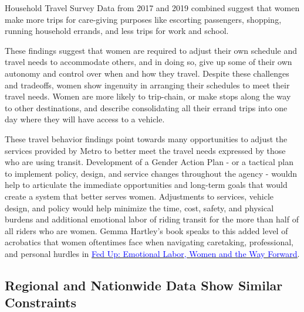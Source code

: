 \documentclass[
  12pt,
]{article}
\begin{document}
\begin{flushleft}
Household Travel Survey Data from 2017 and 2019 combined suggest that women make more trips for care-giving purposes like escorting passengers, shopping, running household errands, and less trips for work and school.

These findings suggest that women are required to adjust their own schedule and travel needs to accommodate others, and in doing so, give up some of their own autonomy and control over when and how they travel. Despite these challenges and tradeoffs, women show ingenuity in arranging their schedules to meet their travel needs. Women are more likely to trip-chain, or make stops along the way to other destinations, and describe consolidating all their errand trips into one day where they will have access to a vehicle.

These travel behavior findings point towards many opportunities to adjust the services provided by Metro to better meet the travel needs expressed by those who are using transit. Development of a Gender Action Plan - or a tactical plan to implement policy, design, and service changes throughout the agency - wouldn help to articulate the immediate opportunities and long-term goals that would create a system that better serves women. Adjustments to services, vehicle design, and policy would help minimize the time, cost, safety, and physical burdens and additional emotional labor of riding transit for the more than half of all riders who are women. Gemma Hartley's book speaks to this added level of acrobatics that women oftentimes face when navigating caretaking, professional, and personal hurdles in \href{https://www.gemmahartley.com/}{\underline{\textcolor{blue}{Fed Up: Emotional Labor, Women and the Way Forward}}}.
\end{flushleft}

\newpage
\setlength{\headheight}{10pt}
\setlength{\textheight}{665pt}
\fancyhead[L]{}

\hypertarget{regional-and-nationwide-data-show-similar-constraints}{%
\subsection{Regional and Nationwide Data Show Similar
Constraints}\label{regional-and-nationwide-data-show-similar-constraints}}
\end{document}
